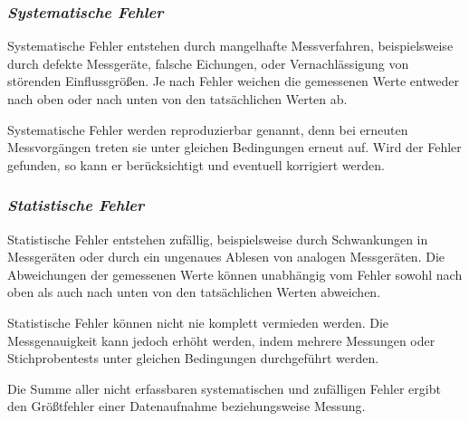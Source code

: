 \documentclass[a4paper]{article}
\providecommand*{\DUrubric}[2][class-arg]{%
  \subsubsection*{\centering\textit{\textmd{#2}}}}
\begin{document}
\DUrubric{Systematische Fehler}

Systematische Fehler entstehen durch mangelhafte Messverfahren, beispielsweise
durch defekte Messgeräte, falsche Eichungen, oder Vernachlässigung von störenden
Einflussgrößen. Je nach Fehler weichen die gemessenen Werte entweder nach oben
oder nach unten von den tatsächlichen Werten ab.

Systematische Fehler werden \textquotedbl{}reproduzierbar\textquotedbl{} genannt, denn bei erneuten
Messvorgängen treten sie unter gleichen Bedingungen erneut auf. Wird der Fehler
gefunden, so kann er berücksichtigt und eventuell korrigiert werden.

\DUrubric{Statistische Fehler}

Statistische Fehler entstehen zufällig, beispielsweise durch Schwankungen in
Messgeräten oder durch ein ungenaues Ablesen von analogen Messgeräten. Die
Abweichungen der gemessenen Werte können unabhängig vom Fehler sowohl nach oben
als auch nach unten von den tatsächlichen Werten abweichen.




Statistische Fehler können nicht nie komplett vermieden werden. Die
Messgenauigkeit kann jedoch erhöht werden, indem mehrere Messungen oder
Stichprobentests unter gleichen Bedingungen durchgeführt werden.

Die Summe aller nicht erfassbaren systematischen und zufälligen Fehler ergibt
den Größtfehler einer Datenaufnahme beziehungsweise Messung.
\end{document}
